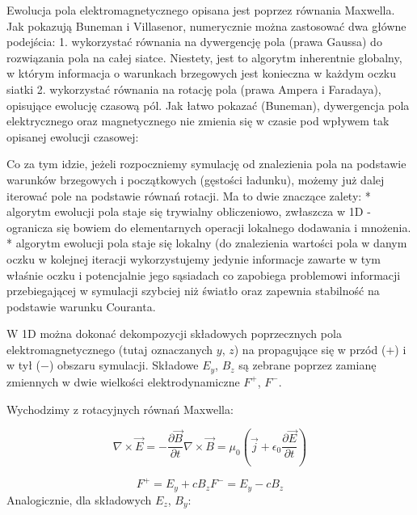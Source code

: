 {    Ewolucja pola elektromagnetycznego opisana jest poprzez równania Maxwella. Jak pokazują Buneman i Villasenor,
    numerycznie można zastosować dwa główne podejścia: 
    1. wykorzystać równania na dywergencję pola (prawa Gaussa) do rozwiązania pola na całej siatce. Niestety, jest to
    algorytm inherentnie globalny, w którym informacja o warunkach brzegowych jest konieczna w każdym oczku siatki
    2. wykorzystać równania na rotację pola (prawa Ampera i Faradaya), opisujące ewolucję czasową pól. Jak łatwo pokazać (Buneman),
    dywergencja pola elektrycznego oraz magnetycznego nie zmienia się w czasie pod wpływem tak opisanej ewolucji czasowej:

    Co za tym idzie, jeżeli rozpoczniemy symulację od znalezienia pola na podstawie warunków brzegowych i początkowych (gęstości
    ładunku), możemy już dalej iterować pole na podstawie równań rotacji. Ma to dwie znaczące zalety:
    * algorytm ewolucji pola staje się trywialny obliczeniowo, zwłaszcza w 1D -
        ogranicza się bowiem do elementarnych operacji lokalnego dodawania i mnożenia.
    * algorytm ewolucji pola staje się lokalny (do znalezienia wartości pola w danym oczku w kolejnej iteracji wykorzystujemy
    jedynie informacje zawarte w tym właśnie oczku i potencjalnie jego sąsiadach 
    co zapobiega problemowi informacji przebiegającej w symulacji szybciej niż światło oraz zapewnia stabilność na podstawie
    warunku Couranta.

    W 1D można dokonać dekompozycji składowych poprzecznych pola elektromagnetycznego (tutaj oznaczanych $y$, $z$) na
    propagujące się w przód ($+$) i w tył ($-$) obszaru symulacji. Składowe $E_y$, $B_z$ są zebrane poprzez zamianę zmiennych
    w dwie wielkości elektrodynamiczne $F^+$, $F^-$.

    Wychodzimy z rotacyjnych równań Maxwella:

    \begin{equation}
        \nabla \times \vec{E} = -\frac{\partial \vec{B}}{\partial t}
        \nabla \times \vec{B} = \mu_0 (\vec{j} + \epsilon_0 \frac{\partial \vec{E}}{\partial t})
        \label{eqn:Maxwell-rotation-derivation}
    \end{equation}


    \begin{equation}
        F^{+} = E_y + c B_z
        F^{-} = E_y - c B_z
        \label{eqn:Birdsall-electromagnetic-quantities}
    \end{equation}
    Analogicznie, dla składowych $E_z$, $B_y$:

}
